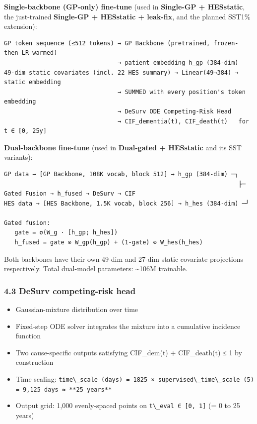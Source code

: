 \documentclass[
  11pt,
]{article}
\newcommand{\passthrough}[1]{#1}
\providecommand{\tightlist}{%
  \setlength{\itemsep}{0pt}\setlength{\parskip}{0pt}}
\begin{document}
\textbf{Single-backbone (GP-only) fine-tune} (used in \textbf{Single-GP
+ HESstatic}, the just-trained \textbf{Single-GP + HESstatic +
leak-fix}, and the planned SST1\% extension):

\begin{lstlisting}
GP token sequence (≤512 tokens) → GP Backbone (pretrained, frozen-then-LR-warmed)
                                → patient embedding h_gp (384-dim)
49-dim static covariates (incl. 22 HES summary) → Linear(49→384) → static embedding
                                → SUMMED with every position's token embedding
                                → DeSurv ODE Competing-Risk Head
                                → CIF_dementia(t), CIF_death(t)   for t ∈ [0, 25y]
\end{lstlisting}

\textbf{Dual-backbone fine-tune} (used in \textbf{Dual-gated +
HESstatic} and its SST variants):

\begin{lstlisting}
GP data → [GP Backbone, 108K vocab, block 512] → h_gp (384-dim) ─┐
                                                                  ├─ Gated Fusion → h_fused → DeSurv → CIF
HES data → [HES Backbone, 1.5K vocab, block 256] → h_hes (384-dim) ─┘

Gated fusion:
   gate = σ(W_g · [h_gp; h_hes])
   h_fused = gate ⊙ W_gp(h_gp) + (1-gate) ⊙ W_hes(h_hes)
\end{lstlisting}

Both backbones have their own 49-dim and 27-dim static covariate
projections respectively. Total dual-model parameters:
\textasciitilde106M trainable.

\subsubsection{4.3 DeSurv competing-risk
head}\label{desurv-competing-risk-head}

\begin{itemize}
\tightlist
\item
  Gaussian-mixture distribution over time
\item
  Fixed-step ODE solver integrates the mixture into a cumulative
  incidence function
\item
  Two cause-specific outputs satisfying CIF\_dem(t) + CIF\_death(t) ≤ 1
  by construction
\item
  Time scaling:
  \passthrough{\lstinline!time\_scale (days) = 1825 × supervised\_time\_scale (5) = 9,125 days ≈ **25 years**!}
\item
  Output grid: 1,000 evenly-spaced points on
  \passthrough{\lstinline!t\_eval ∈ [0, 1]!} (= 0 to 25 years)
\end{itemize}
\end{document}
